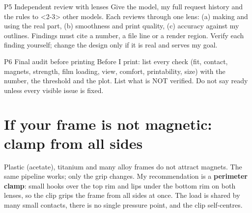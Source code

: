 \documentclass[10pt,a4paper,oneside]{article}
\begin{document}
\begin{template}{P5 \textbullet{} Independent review with lenses}
Give the model, my full request history and the rules to <2-3> other models. Each reviews through one lens: (a) making and using
the real part, (b) smoothness and print quality, (c) accuracy against my outlines. Findings must cite a number, a file line or a
render region. Verify each finding yourself; change the design only if it is real and serves my goal.
\end{template}

\begin{template}{P6 \textbullet{} Final audit before printing}
Before I print: list every check (fit, contact, magnets, strength, film loading, view, comfort, printability, size) with the
number, the threshold and the plot. List what is NOT verified. Do not say ready unless every visible issue is fixed.
\end{template}

\section{If your frame is not magnetic: clamp from all sides}
Plastic (acetate), titanium and many alloy frames do not attract magnets. The same pipeline works; only the grip changes.
My recommendation is a \textbf{perimeter clamp}: small hooks over the top rim and lips under the bottom rim on both lenses, so the clip grips the
frame from all sides at once. The load is shared by many small contacts, there is no single pressure point, and the clip self-centres.
\end{document}
